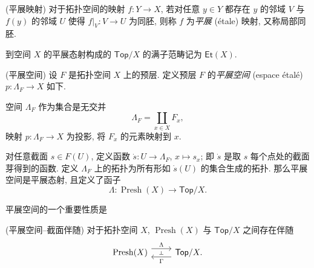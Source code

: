 \begin{definition}
    {(平展映射)}
    对于拓扑空间的映射 $f \colon Y \to X$,
    若对任意 $y\in Y$ 都存在 $y$ 的邻域 $V$ 与 $f(y)$ 的邻域 $U$ 使得 $f|_V \colon V \to U$ 为同胚,
    则称 $f$ 为\emph{平展} (étale) 映射, 又称局部同胚.

    到空间 $X$ 的平展态射构成的 $\mathsf {Top}/X$ 的满子范畴记为 $\mathsf {Et}(X)$.
\end{definition}

\begin{propdef}
    {(平展空间)}
    设 $F$ 是拓扑空间 $X$ 上的预层. 定义预层 $F$ 的\emph{平展空间} (espace étalé)
    $p \colon \Lambda_F \to X$ 如下.

    空间 $\Lambda_F$ 作为集合是无交并
    $$
    \Lambda_F = \coprod_{x\in X} F_x,
    $$
    映射 $p \colon \Lambda_F \to X$ 为投影, 将 $F_x$ 的元素映射到 $x$.
    
    对任意截面 $s\in F(U)$, 定义函数 $\dot{s} \colon U \to \Lambda_F$, $x\mapsto s_x$; 即 $\dot s$ 是取 $s$ 每个点处的截面芽得到的函数.
    定义 $\Lambda_F$ 上的拓扑为所有形如 $\dot{s}(U)$ 的集合生成的拓扑.
    那么平展空间是平展态射, 且定义了函子
    $$
    \Lambda \colon \operatorname{Presh}(X) \to \mathsf {Top}/X.
    $$
\end{propdef}

平展空间的一个重要性质是

\begin{prop}
    [label={etale-section-adjoint}]
    {(平展空间--截面伴随)}
    对于拓扑空间 $X$, $\operatorname{Presh}(X)$ 与 $\mathsf {Top}/X$ 之间存在伴随
    \[\begin{tikzcd}[ampersand replacement=\&]
    	{\operatorname{Presh}(X)} \& {\mathsf {Top}/X.}
    	\arrow[""{name=0, anchor=center, inner sep=0}, "\Gamma", shift left=2, from=1-2, to=1-1]
    	\arrow[""{name=1, anchor=center, inner sep=0}, "\Lambda", shift left=2, from=1-1, to=1-2]
    	\arrow["\dashv"{anchor=center, rotate=-90}, draw=none, from=1, to=0]
    \end{tikzcd}\]
\end{prop}

